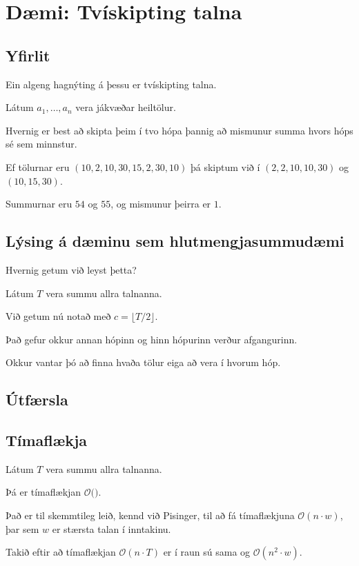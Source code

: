 \section{Dæmi: Tvískipting talna}
\subsection{Yfirlit}
{
    {
        \item<1-> Ein algeng hagnýting á þessu er tvískipting talna.
        \item<2-> Látum $a_1, \dots, a_n$ vera jákvæðar heiltölur.
        \item<3-> Hvernig er best að skipta þeim í tvo hópa þannig að mismunur summa hvors hóps sé sem minnstur.
        \item<4-> Ef tölurnar eru $(10, 2, 10, 30, 15, 2, 30, 10)$ þá skiptum við í $(2, 2, 10, 10, 30)$ og $(10, 15, 30)$.
        \item<5-> Summurnar eru $54$ og $55$, og mismunur þeirra er $1$.
    }
}


\subsection{Lýsing á dæminu sem hlutmengjasummudæmi}
{
    {
        \item<1-> Hvernig getum við leyst þetta?
        \item<2-> Látum $T$ vera summu allra talnanna.
        \item<3-> Við getum nú notað  með $c = \lfloor T/2 \rfloor$.
        \item<4-> Það gefur okkur annan hópinn og hinn hópurinn verður afgangurinn.
        \item<5-> Okkur vantar þó að finna hvaða tölur eiga að vera í hvorum hóp.
    }
}

\subsection{Útfærsla}
{
}

\subsection{Tímaflækja}
{
    {
        \item<1-> Látum $T$ vera summu allra talnanna.
        \item<2-> Þá er tímaflækjan $\mathcal{O}($$)$.
        \item<4-> Það er til skemmtileg leið, kennd við Pisinger,
                    til að fá tímaflækjuna $\mathcal{O}(n \cdot w)$, þar sem $w$ er stærsta talan í inntakinu.
        \item<5-> Takið eftir að tímaflækjan $\mathcal{O}(n \cdot T)$ er í raun sú sama og $\mathcal{O}(n^2 \cdot w)$.
    }
}

